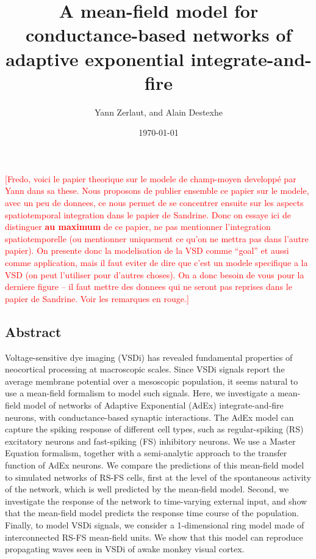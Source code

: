 \documentclass[8pt, colorlinks, a4paper]{article}
\author{Yann Zerlaut, \corr{Sandrine Chemla, Frederic Chavane} and
  Alain Destexhe}
\date{\today}
\title{A mean-field model for conductance-based networks of adaptive
  exponential integrate-and-fire \corr{neurons}}
\newcommand{\remark}[1]{{\textcolor{red}{#1}}}
\newcommand{\corr}[1]{{#1}}
\begin{document}
\maketitle

\remark{[Fredo, voici le papier theorique sur le modele de champ-moyen
  developp\'e par Yann dans sa these.  Nous proposons de publier
  ensemble ce papier sur le modele, avec un peu de donnees, ce nous
  permet de se concentrer ensuite sur les aspects spatiotemporal
  integration dans le papier de Sandrine.  Donc on essaye ici de
  distinguer {\bf au maximum} de ce papier, ne pas mentionner
  l'integration spatiotemporelle (ou mentionner uniquement ce qu'on ne
  mettra pas dans l'autre papier).  On presente donc la modelisation
  de la VSD comme ``goal'' et aussi comme application, mais il faut
  eviter de dire que c'est un modele specifique a la VSD (on peut
  l'utiliser pour d'autres choses).  On a donc besoin de vous pour la
  derniere figure -- il faut mettre des donnees qui ne seront pas
  reprises dans le papier de Sandrine.  Voir les remarques en rouge.]}

\linenumbers

\subsection*{Abstract}
\label{sec-1}
\bfseries

Voltage-sensitive dye imaging (VSDi) has revealed fundamental
properties of neocortical processing at macroscopic scales.  Since
VSDi signals report the average membrane potential over a mesoscopic
population, it seems natural to use a mean-field formalism to model
such signals. Here, we investigate a mean-field model of networks of
Adaptive Exponential (AdEx) integrate-and-fire neurons, with
conductance-based synaptic interactions. The AdEx model can capture
the spiking response of different cell types, such as regular-spiking
(RS) excitatory neurons and fast-spiking (FS) inhibitory neurons.  We
use a Master Equation formalism, together with a semi-analytic
approach to the transfer function of AdEx neurons.  We compare the
predictions of this mean-field model to simulated networks of RS-FS
cells, first at the level of the spontaneous activity of the network,
which is well predicted by the mean-field model.  Second, we
investigate the response of the network to time-varying external
input, and show that the mean-field model \corr{predicts} the response
time course of the population. \corr{Finally, to model VSDi signals,
  we consider a 1-dimensional ring model made of interconnected RS-FS
  mean-field units. We show that this model can reproduce propagating
  waves seen in VSDi of awake monkey visual cortex.}
\end{document}
